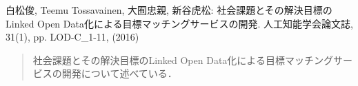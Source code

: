 
\begin{thebibliography}{99}

白松俊, Teemu Tossavainen, 大囿忠親, 新谷虎松: 社会課題とその解決目標のLinked Open Data化による目標マッチングサービスの開発. 人工知能学会論文誌, 31(1), pp. LOD-C\_1-11, (2016)
\begin{quote}
社会課題とその解決目標のLinked Open Data化による目標マッチングサービスの開発について述べている．
\end{quote}

\end{thebibliography}
